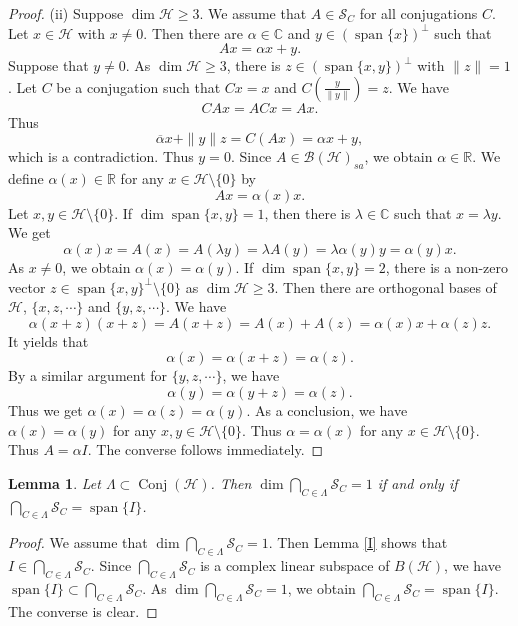 \documentclass[11pt]{amsart}
\newtheorem{lemma}[theorem]{Lemma}
\theoremstyle{remark}
\newcommand{\BH}{\mathcal{B(H)}}
\newcommand{\cH}{{\mathcal{H}}}
\newcommand{\SC}{\mathcal{S}_C}
\newcommand{\Conj}{\operatorname{Conj}(\cH)}
\newcommand{\Span}{\operatorname{span}}
\begin{document}
\begin{proof}
(ii) Suppose $\dim \cH \ge 3$. We assume that  $A \in \SC$ for all conjugations $C$.  Let $x \in \cH$ with $x \neq 0$. Then there are $\alpha \in \mathbb{C}$ and $y \in (\operatorname{span} \{x\} )^{\perp} $ such that
\[
Ax= \alpha x + y.
\]
Suppose that $y \neq 0$. As $\dim \cH \ge 3$, there is $z \in (\operatorname{span} \{x, y\} )^{\perp} $ with $\|z\|=1$. 
Let $C$ be a conjugation such that $Cx=x$ and $C(\frac{y}{\|y\|})=z$. We have 
\[
CAx=ACx=Ax.
\]
Thus 
\[
\overline{\alpha} x + \|y\|z= C(Ax)=\alpha x + y, 
\]
which is a contradiction. Thus $y=0$. Since $A \in \BH_{sa}$, we obtain $\alpha \in \mathbb{R}$. 
We define $\alpha(x) \in \mathbb{R}$ for any $x \in \cH \setminus \{0\}$  by 
\[
Ax= \alpha(x)x.
\]
Let $x, y \in \cH \setminus \{0\}$. If $\dim \operatorname{span} \{x,y\}=1$, then there is $\lambda \in \mathbb{C}$ such that $x=\lambda y$. We get 
\[
\alpha(x)x=A(x)=A(\lambda y)=\lambda A(y)=\lambda \alpha(y) y=\alpha(y) x.
\]
As $x \neq 0$, we obtain $\alpha(x)=\alpha(y)$. If $\dim \operatorname{span} \{x,y\}=2$, there is a non-zero vector $z \in \operatorname{span} \{x,y\} ^{\perp} \setminus \{0\}$ as $\dim \cH \ge 3$. Then there are orthogonal bases of $\cH$, $\{x,z, \cdots\}$ and $\{y, z, \cdots\}$. We have
\[
\alpha(x+z)(x+z)=A(x+z)=A(x)+A(z)=\alpha(x)x+\alpha(z)z.
\] 
It yields that 
\[
\alpha(x)=\alpha(x+z)=\alpha(z).
\]
By a similar argument for $\{y, z, \cdots\}$, we have
\[
\alpha(y)=\alpha(y+z)=\alpha(z).
\]
Thus we get $\alpha(x)=\alpha(z)=\alpha(y)$. As a conclusion, we have $\alpha(x)=\alpha(y)$ for any $x, y \in \cH \setminus \{0\} $. Thus $\alpha=\alpha(x)$ for any $x \in \cH \setminus \{0\}$.  Thus $A=\alpha I$. The converse follows immediately.
\end{proof}



\begin{lemma}\label{dim1}
Let $\Lambda \subset \Conj $. Then $\dim \bigcap_{C \in \Lambda} \SC =1$ if and only if  $\bigcap_{C \in \Lambda} \SC=\Span \{I\}$.
\end{lemma}
\begin{proof}
We assume that $\dim \bigcap_{C \in \Lambda} \SC =1$. Then Lemma \ref{I} shows that $I \in \bigcap_{C \in \Lambda} \SC $. Since $\bigcap_{C \in \Lambda} \SC$ is a complex linear subspace of $B(\cH)$, we have $\Span \{I\} \subset \bigcap_{C \in \Lambda} \SC $. As $\dim \bigcap_{C \in \Lambda} \SC =1$, we obtain $\bigcap_{C \in \Lambda} \SC=\Span \{I\}$. The converse is clear.
\end{proof}
\end{document}
